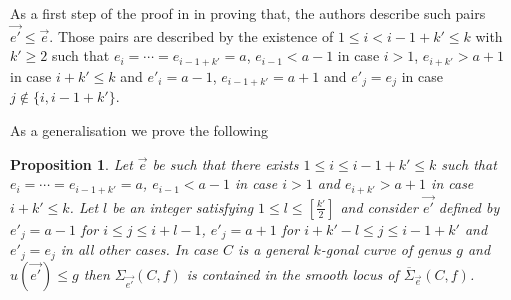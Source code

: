 \documentclass{article}
\newtheorem{proposition}{Proposition}
\theoremstyle{definition}
\theoremstyle{remark}
\begin{document}
As a first step of the proof in \cite{ref6} in proving that, the authors describe such pairs $\overrightarrow {e'} \leq \overrightarrow {e}$.
Those pairs are described by the existence of $1 \leq i < i-1+k' \leq k$ with $k' \geq 2$ such that $e_i = \cdots =e_{i-1+k'}=a$, $e_{i-1} <a-1$ in case $i>1$, $e_{i+k'} > a+1$ in case $i+k'\leq k$ and $e'_i=a-1$, $e_{i-1+k'}=a+1$ and $e'_j=e_j$ in case $j \notin \{ i, i-1+k' \}$.

As a generalisation we prove the following
\begin{proposition}\label{prop5.1}
Let $\overrightarrow {e}$ be such that there exists $1 \leq i \leq i-1+k' \leq k$ such that $e_i = \cdots = e_{i-1+k'}=a$, $e_{i-1}<a-1$ in case $i >1$ and $e_{i+k'}>a+1$ in case $i+k' \leq k$.
Let $l$ be an integer satisfying $1 \leq l \leq [\frac{k'}{2}]$ and consider $\overrightarrow {e'}$ defined by $e'_j=a-1$ for $i \leq j \leq i+l-1$, $e'_j=a+1$ for $i+k'-l \leq j \leq i-1+k'$ and $e'_j=e_j$ in all other cases.
In case $C$ is a general $k$-gonal curve of genus $g$ and $u(\overrightarrow {e'})\leq g$ then $\Sigma _{\overrightarrow {e'}}(C,f)$ is contained in the smooth locus of $\overline{\Sigma}_{\overrightarrow {e}}(C,f)$.
\end{proposition}
\end{document}
